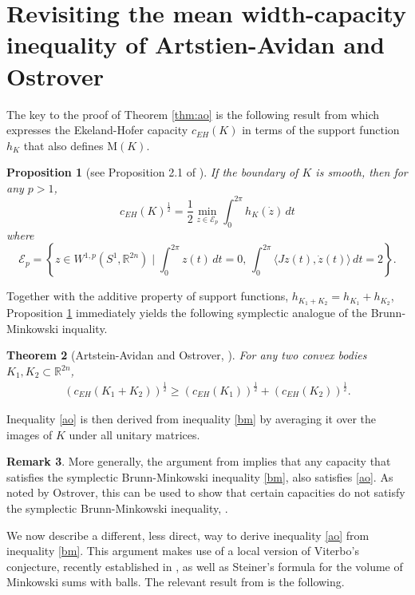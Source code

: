 \documentclass[12pt]{amsart}
\newtheorem{theorem}{Theorem}[section]
\newtheorem{proposition}[theorem]{Proposition}
\theoremstyle{definition}
\newtheorem{remark}[theorem]{Remark}
\newcommand{\RR}{{\mathbb R}}
\newcommand{\mw}{{{\mathrm {M}}}}
\begin{document}
\section{Revisiting the mean width-capacity inequality of Artstien-Avidan and Ostrover} \label{newpath}
  
The key to the proof of Theorem \ref{thm:ao} is the following result from \cite {ao} which expresses the Ekeland-Hofer capacity $c_{EH}(K)$ in terms of the support function $ h_K$ that also defines $\mw(K)$. 
\begin{proposition}[see Proposition 2.1 of \cite{ao}]\label{p} If the boundary of $K$ is smooth, then for any $p>1$,
\begin{equation*}
   c_{EH}(K)^{\frac{1}{2}} = \frac{1}{2} \min_{z \in \mathcal{E}_p}  \int_0^{2 \pi}  h_K(\dot{z}) \, dt
\end{equation*}
    where 
\begin{equation*}
    \mathcal{E}_p =\left\{z \in W^{1,p}(S^1, \RR^{2n}) \mid  \int_0^{2 \pi} z(t)\,dt =0,\, \int_0^{2 \pi} \langle Jz(t), \dot{z}(t) \rangle \, dt =2 \right\}.
\end{equation*}    
\end{proposition}



Together with the additive property of support functions, $h_{K_1 +K_2} = h_{K_1} +h_{K_2}$, Proposition \ref{p} immediately yields the following symplectic analogue of the Brunn-Minkowski inquality.
\begin{theorem}[Artstein-Avidan and Ostrover, \cite{ao}]
    For any two convex bodies  $K_1, K_2 \subset \RR^{2n}$, 
\begin{align}\label{bm}
    (c_{EH}(K_1+K_2))^{\frac{1}{2}} \geq (c_{EH}(K_1))^{\frac{1}{2}}+(c_{EH}(K_2))^{\frac{1}{2}}.
\end{align}
\end{theorem}
Inequality \eqref{ao} is then  derived from inequality \eqref{bm} by averaging it over the images of $K$ under all unitary matrices.  

\begin{remark}
    More generally, the argument from \cite{ao} implies that any capacity that satisfies the symplectic Brunn-Minkowski inequality \eqref{bm}, also satisfies \eqref{ao}. As noted by Ostrover, this can be used to show that certain capacities do not satisfy the symplectic Brunn-Minkowski inequality, \cite{kl1}.
\end{remark}

We now describe a different, less direct, way to derive inequality \eqref{ao} from inequality \eqref{bm}. This argument makes use of a local version of Viterbo's conjecture, recently established in \cite{ab}, as well as Steiner's formula for the volume of Minkowski sums with balls. The relevant result from \cite{ab} is the following.
\end{document}
